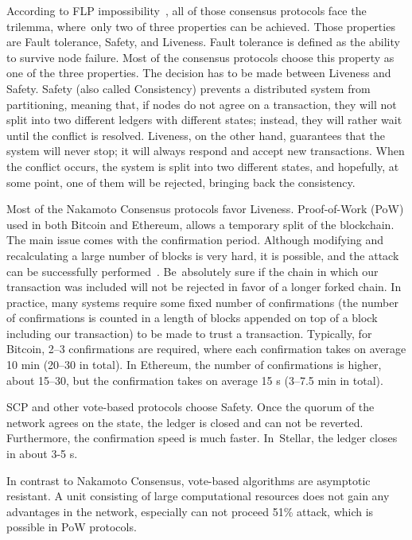\documentclass[applsci,article,accept,moreauthors,pdftex]{Definitions/mdpi}
\begin{document}
According to FLP impossibility~\cite{fischer1985impossibility}, all of those consensus protocols face the trilemma, where~only two of three properties can be achieved. Those properties are Fault tolerance, Safety, and Liveness. Fault tolerance is defined as the ability to survive node failure. Most of the consensus protocols choose this property as one of the three properties. The decision has to be made between Liveness and Safety. Safety (also called Consistency) prevents a distributed system from partitioning, meaning that, if nodes do not agree on a transaction, they will not split into two different ledgers with different states; instead, they will rather wait until the conflict is resolved. Liveness, on the other hand, guarantees that the system will never stop; it will always respond and accept new transactions. When the conflict occurs, the system is split into two different states, and hopefully, at some point, one of them will be rejected, bringing back the consistency.

Most of the Nakamoto Consensus protocols favor Liveness. Proof-of-Work (PoW) used in both Bitcoin and Ethereum, allows a temporary split of the blockchain. The main issue comes with the confirmation period.
Although modifying and recalculating a large number of blocks is very hard, it is possible, and the attack can be successfully %
performed~\cite{sayeed2019assessing}. Be~absolutely sure if the chain in which our transaction was included will not be rejected in favor of a longer forked chain. In practice, many systems require some fixed number of confirmations (the number of confirmations is counted in a length of blocks appended on top of a block including our transaction) %
to be made to trust a transaction. Typically, for Bitcoin, 2--3 confirmations are required, where each confirmation takes on average 10 min (20--30 in total). In Ethereum, the number of confirmations is higher, about 15--30, but the confirmation takes on average 15 s (3--7.5 min in total). 

SCP and other vote-based protocols choose Safety. Once the quorum of the network agrees on the state, the ledger is closed and can not be reverted. Furthermore, the confirmation speed is much faster. In~Stellar, the ledger closes in about 3-5 s. 

In contrast to Nakamoto Consensus, vote-based algorithms are asymptotic resistant. A unit consisting of large computational resources does not gain any advantages in the network, especially can not proceed 51\% attack, which is possible in PoW protocols. 
\end{document}

